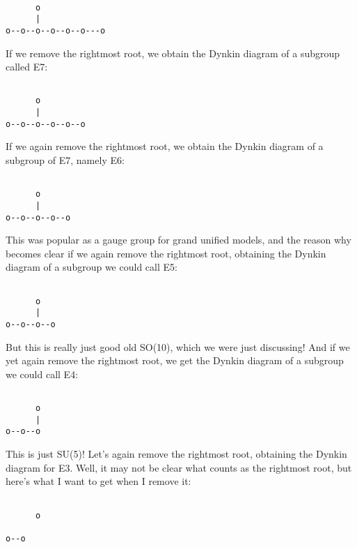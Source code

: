 \begin{verbatim}

      o      
      |      
o--o--o--o--o--o---o

\end{verbatim}
    
If we remove the rightmost root, we obtain the Dynkin diagram of
a subgroup called E7:


\begin{verbatim}

      o      
      |      
o--o--o--o--o--o

\end{verbatim}
    
If we again remove the rightmost root, we obtain the Dynkin diagram
of a subgroup of E7, namely E6:


\begin{verbatim}

      o      
      |      
o--o--o--o--o

\end{verbatim}
    
This was popular as a gauge group for grand unified models, and 
the reason why becomes clear if we again remove the rightmost root,
obtaining the Dynkin diagram of a subgroup we could call E5:


\begin{verbatim}

      o      
      |      
o--o--o--o

\end{verbatim}
    
But this is really just good old SO(10), which we were just
discussing!  And if we yet again remove the rightmost root, we 
get the Dynkin diagram of a subgroup we could call E4:


\begin{verbatim}

      o      
      |      
o--o--o

\end{verbatim}
    
This is just SU(5)!  Let's again remove the rightmost root, 
obtaining the Dynkin diagram for E3.  Well, it may not be clear
what counts as the rightmost root, but here's what I want to 
get when I remove it:


\begin{verbatim}

      o      
            
o--o

\end{verbatim}
    
